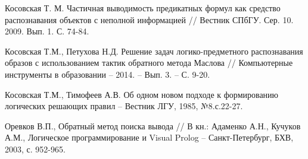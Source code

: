 \documentclass{spisok-article}
\begin{document}
\makeatletter\renewcommand{\refname}{\intl@references}\makeatother
\begin{thebibliography}{8}

 Косовская Т. М. Частичная выводимость предикатных формул как средство распознавания объектов с неполной информацией // Вестник СПбГУ. Сер. 10. 2009. Вып. 1. С. 74-84.

   Косовская Т.М., Петухова Н.Д. Решение задач логико-предметного распознавания образов с использованием тактик обратного метода Маслова // Компьютерные инструменты в образовании – 2014. – Вып. 3. – С. 9-20.

   Косовская Т.М., Тимофеев А.В. Об одном новом подходе к формированию логических решающих правил – Вестник ЛГУ, 1985, №8.с.22-27.

 Оревков В.П., Обратный метод поиска вывода // В кн.: Адаменко А.Н., Кучуков А.М., Логическое программирование и Visual Prolog – Санкт-Петербург, БХВ, 2003, с. 952-965.

\end{thebibliography}
\end{document}
